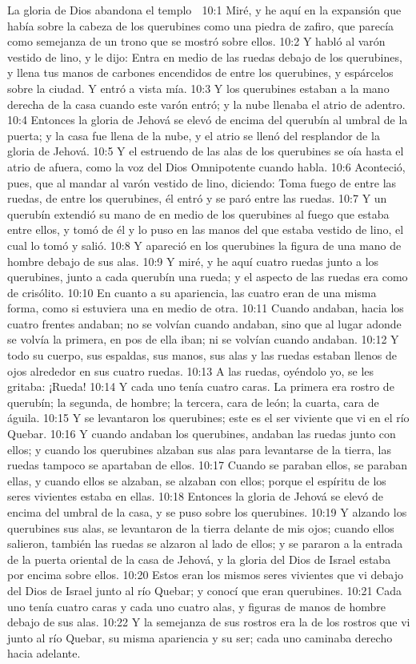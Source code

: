 La gloria de Dios abandona el templo  

10:1 Miré, y he aquí en la expansión que había sobre la cabeza de los querubines como una piedra de zafiro, que parecía como semejanza de un trono que se mostró sobre ellos. 
10:2 Y habló al varón vestido de lino, y le dijo: Entra en medio de las ruedas debajo de los querubines, y llena tus manos de carbones encendidos de entre los querubines, y espárcelos sobre la ciudad.  Y entró a vista mía.  
10:3 Y los querubines estaban a la mano derecha de la casa cuando este varón entró; y la nube llenaba el atrio de adentro.  
10:4 Entonces la gloria de Jehová se elevó de encima del querubín al umbral de la puerta; y la casa fue llena de la nube, y el atrio se llenó del resplandor de la gloria de Jehová.  
10:5 Y el estruendo de las alas de los querubines se oía hasta el atrio de afuera, como la voz del Dios Omnipotente cuando habla.  
10:6 Aconteció, pues, que al mandar al varón vestido de lino, diciendo: Toma fuego de entre las ruedas, de entre los querubines, él entró y se paró entre las ruedas.  
10:7 Y un querubín extendió su mano de en medio de los querubines al fuego que estaba entre ellos, y tomó de él y lo puso en las manos del que estaba vestido de lino, el cual lo tomó y salió.  
10:8 Y apareció en los querubines la figura de una mano de hombre debajo de sus alas.  
10:9 Y miré, y he aquí cuatro ruedas junto a los querubines, junto a cada querubín una rueda; y el aspecto de las ruedas era como de crisólito.  
10:10 En cuanto a su apariencia, las cuatro eran de una misma forma, como si estuviera una en medio de otra.  
10:11 Cuando andaban, hacia los cuatro frentes andaban; no se volvían cuando andaban, sino que al lugar adonde se volvía la primera, en pos de ella iban; ni se volvían cuando andaban.  
10:12 Y todo su cuerpo, sus espaldas, sus manos, sus alas y las ruedas estaban llenos de ojos alrededor  en sus cuatro ruedas.  
10:13 A las ruedas, oyéndolo yo, se les gritaba: ¡Rueda! 
10:14 Y cada uno tenía cuatro caras. La primera era rostro de querubín; la segunda, de hombre; la tercera, cara de león; la cuarta, cara de águila. 
10:15 Y se levantaron los querubines; este es el ser viviente que vi en el río Quebar.  
10:16 Y cuando andaban los querubines, andaban las ruedas junto con ellos; y cuando los querubines alzaban sus alas para levantarse de la tierra, las ruedas tampoco se apartaban de ellos.  
10:17 Cuando se paraban ellos, se paraban ellas, y cuando ellos se alzaban, se alzaban con ellos; porque el espíritu de los seres vivientes estaba en ellas.  
10:18 Entonces la gloria de Jehová se elevó de encima del umbral de la casa, y se puso sobre los querubines.  
10:19 Y alzando los querubines sus alas, se levantaron de la tierra delante de mis ojos; cuando ellos salieron, también las ruedas se alzaron al lado de ellos; y se pararon a la entrada de la puerta oriental de la casa de Jehová, y la gloria del Dios de Israel estaba por encima sobre ellos.  
10:20 Estos eran los mismos seres vivientes que vi debajo del Dios de Israel junto al río Quebar; y conocí que eran querubines.  
10:21 Cada uno tenía cuatro caras y cada uno cuatro alas, y figuras de manos de hombre debajo de sus alas.  
10:22 Y la semejanza de sus rostros era la de los rostros que vi junto al río Quebar, su misma apariencia y su ser; cada uno caminaba derecho hacia adelante.  

